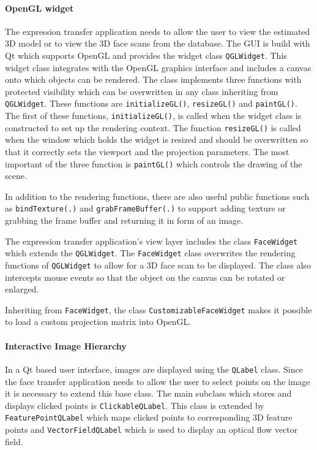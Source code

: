 \documentclass[11pt,a4paper]{report}
\begin{document}
\paragraph{OpenGL widget}
The expression transfer application needs to allow the user to view the
estimated 3D model or to view the 3D face scans from the database. The GUI is build with Qt
which supports OpenGL and provides the widget class \texttt{QGLWidget}. This
widget class integrates with the OpenGL graphics interface and includes a canvas
onto which objects can be rendered. The class implements three functions with
protected visibility which
can be overwritten in any class inheriting from \texttt{QGLWidget}. These
functions are \texttt{initializeGL()}, \texttt{resizeGL()} and
\texttt{paintGL()}. The first of these functions, \texttt{initializeGL()}, is
called when the widget class is constructed to set up the rendering context. The function \texttt{resizeGL()} is
called when the window which holds the widget is resized and should be
overwritten so that it correctly sets the viewport and the projection parameters. The most important of
the three function is \texttt{paintGL()} which controls the drawing of the
scene.

In addition to the rendering functions, there are also useful public functions
such as \texttt{bindTexture(.)} and \texttt{grabFrameBuffer(.)} to support
adding texture or grabbing the frame buffer and returning it in form of an
image.

The expression transfer application's view layer includes the class
\texttt{FaceWidget} which extends the \texttt{QGLWidget}. The \texttt{FaceWidget} class overwrites the rendering functions of \texttt{QGLWidget} to allow for a
3D face scan to be displayed. The class also intercepts mouse events so that the
object on the canvas can be rotated or enlarged.

Inheriting from \texttt{FaceWidget}, the class \texttt{CustomizableFaceWidget}
makes it possible to load a custom projection matrix into OpenGL.

\paragraph{Interactive Image Hierarchy}
In a Qt based user interface, images are displayed using the \texttt{QLabel} class. Since the
face transfer application needs to allow the user to select points on the image
it is necessary to extend this base class. The main subclass which stores and
displays clicked points is \texttt{ClickableQLabel}. This class is extended by
\texttt{FeaturePointQLabel} which maps clicked points to corresponding 3D
feature points and \texttt{VectorFieldQLabel} which is used to display an
optical flow vector field.
\end{document}
